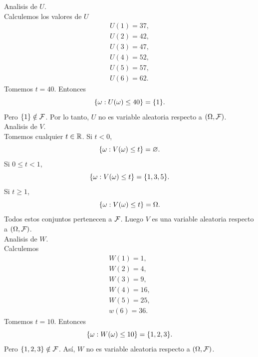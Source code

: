 \documentclass[12pt,a4paper]{article}
\begin{document}
    \begin{solucion}
        Analisis de $U$.\\
        Calculemos los valores de $U$
        \begin{align*}
            U(1)=37,\\
            U(2)=42,\\
            U(3)=47,\\
            U(4)=52,\\
            U(5)=57,\\
            U(6)=62.
        \end{align*}
        Tomemos $t=40$. Entonces
        \begin{equation*}
            \{\omega:U(\omega)\leq40\}=\{1\}.
        \end{equation*}
        Pero $\{1\}\notin\mathcal{F}$. Por lo tanto, $U$ no es variable aleatoria respecto a $(\Omega,\mathcal{F})$.\\
        Analisis de $V$.\\
        Tomemos cualquier $t\in\mathbb{R}$. Si $t\lt0$,
        \begin{equation*}
            \{\omega:V(\omega)\leq t\}=\varnothing.
        \end{equation*}
        Si $0\leq t\lt1$,
        \begin{equation*}
            \{\omega:V(\omega)\leq t\}=\{1,3,5\}.
        \end{equation*}
        Si $t\geq1$,
        \begin{equation*}
            \{\omega:V(\omega)\leq t\}=\Omega.
        \end{equation*}
        Todos estos conjuntos pertenecen a $\mathcal{F}$. Luego $V$ es una variable aleatoria respecto a $(\Omega,\mathcal{F})$.\\
        Analisis de $W$.\\
        Calculemos
        \begin{align*}
            W(1)=1,\\
            W(2)=4,\\
            W(3)=9,\\
            W(4)=16,\\
            W(5)=25,\\
            w(6)=36.
        \end{align*}
        Tomemos $t=10$. Entonces
        \begin{equation*}
            \{\omega:W(\omega)\leq10\}=\{1,2,3\}.
        \end{equation*}
        Pero $\{1,2,3\}\notin\mathcal{F}$. Así, $W$ no es variable aleatoria respecto a $(\Omega,\mathcal{F})$.\\

\end{solucion}
\end{document}
